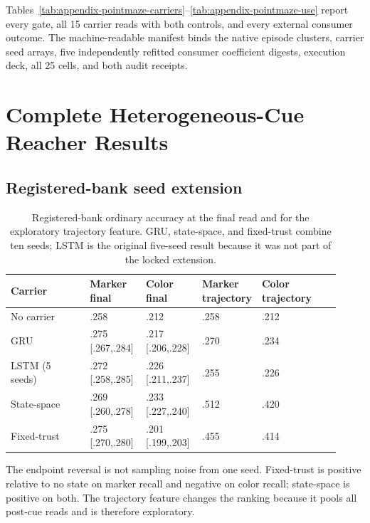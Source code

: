 Tables~\ref{tab:appendix-pointmaze-carriers}--\ref{tab:appendix-pointmaze-use}
report every gate, all 15 carrier reads with both controls, and every external
consumer outcome.  The machine-readable manifest binds the native episode
clusters, carrier seed arrays, five independently refitted consumer coefficient
digests, execution deck, all 25 cells, and both audit receipts.

\PaperPointMazeCarrierResults
\PaperPointMazeGateChecklist
\PaperPointMazeExternalUseResults

\section{Complete Heterogeneous-Cue Reacher Results}
\label{app:reacher}

\subsection{Registered-bank seed extension}

\begin{table}[H]
\centering
\scriptsize
\setlength{\tabcolsep}{3.4pt}
\renewcommand{\arraystretch}{1.08}
\caption{Registered-bank ordinary accuracy at the final read and for the exploratory trajectory feature. GRU, state-space, and fixed-trust combine ten seeds; LSTM is the original five-seed result because it was not part of the locked extension.}
\begin{tabularx}{\linewidth}{@{}>{\raggedright\arraybackslash}p{0.24\linewidth}*{4}{>{\centering\arraybackslash}p{0.17\linewidth}}Y@{}}
\toprule
Carrier & Marker final & Color final & Marker trajectory & Color trajectory \\
\midrule
No carrier & .258 & .212 & .258 & .212 \\
GRU & .275 [.267,.284] & .217 [.206,.228] & .270 & .234 \\
LSTM (5 seeds) & .272 [.258,.285] & .226 [.211,.237] & .255 & .226 \\
State-space & .269 [.260,.278] & .233 [.227,.240] & .512 & .420 \\
Fixed-trust & .275 [.270,.280] & .201 [.199,.203] & .455 & .414 \\
\bottomrule
\end{tabularx}
\end{table}

The endpoint reversal is not sampling noise from one seed. Fixed-trust is positive relative to no state on marker recall and negative on color recall; state-space is positive on both. The trajectory feature changes the ranking because it pools all post-cue reads and is therefore exploratory.

